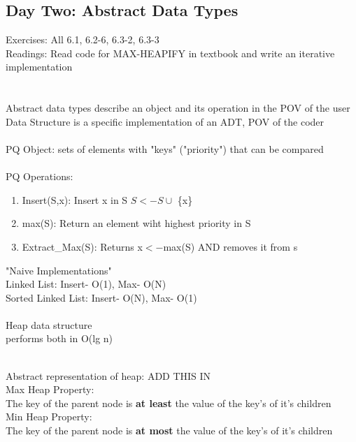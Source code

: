 \documentclass{article}
\begin{document}
	\subsection{Day Two: Abstract Data Types}
		Exercises: All 6.1, 6.2-6, 6.3-2, 6.3-3\\
		Readings: Read code for MAX-HEAPIFY in textbook and write an iterative implementation\\
		\\\\
		Abstract data types describe an object and its operation in the POV of the user\\
		Data Structure is a specific implementation of an ADT, POV of the coder
		\\\\
		PQ Object: sets of elements with "keys" ("priority") that can be compared
		\\\\
		PQ Operations:
		\begin{enumerate}
			\item Insert(S,x): Insert x in S $S<-S\cup$ \{x\}
			\item max(S): Return an element wiht highest priority in S 
			\item Extract\_Max(S): Returns x$<-$max(S) AND removes it from s
		\end{enumerate}
		"Naive Implementations"\\
		Linked List: Insert- O(1), Max- O(N)\\
		Sorted Linked List: Insert- O(N), Max- O(1)\\\\
		Heap data structure\\
		performs both in O(lg n)\\\
		
		Abstract representation of heap: ADD THIS IN\\
		
		Max Heap Property:\\
		The key of the parent node is \textbf{at least} the value of the key's of it's children\\
		
		Min Heap Property:\\
		The key of the parent node is \textbf{at most} the value of the key's of it's children\\
		
\end{document}
